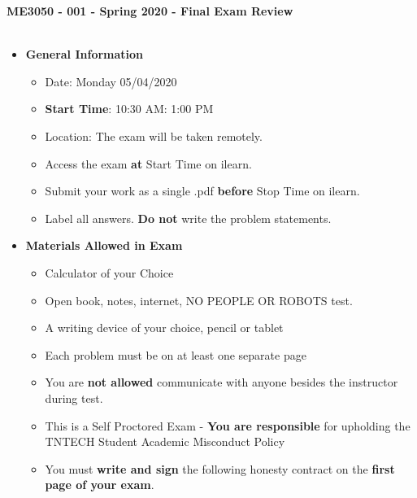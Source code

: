 \documentclass[11pt]{article}
\begin{document}

\textbf{ \LARGE ME3050 - 001 - Spring 2020 - Final Exam Review  } \\\\

\begin{itemize}
	\item  \textbf{\Large General Information}\\

	\begin{itemize}

		\item  {\Large Date: Monday 05/04/2020 }\\
		\item  {\Large {\bf Start Time}: 10:30 AM\hspace{5mm}{\bf Stop Time}: 1:00 PM}\\
		\item  {\Large Location: The exam will be taken remotely. }\\
		\item  {\Large Access the exam {\bf at} Start Time on ilearn.} \\
		\item {\Large Submit your work as a single .pdf {\bf before} Stop Time on ilearn.}\\ 
		\item  {\Large Label all answers. {\bf Do not} write the problem statements.}\\
	\end{itemize}

		\item  \textbf{\Large Materials Allowed in Exam}\\

	\begin{itemize}

		\item  {\Large Calculator of your Choice}
		\item  {\Large Open book, notes, internet, NO PEOPLE OR ROBOTS test.}\vspace{1mm}
		\item  {\Large A writing device of your choice, pencil or tablet}
		\item  {\Large Each problem must be on at least one separate page}
		
		\item  {\Large You are {\bf not allowed} communicate with anyone besides the instructor during test}. \\
		\item {\Large This is a Self Proctored Exam - {\bf You are responsible} for upholding the TNTECH Student Academic Misconduct Policy}\\
		\item  {\Large You must {\bf write and sign} the following honesty contract on the {\bf first page of your exam}}. \\


\end{itemize}
\end{itemize}
\end{document}
